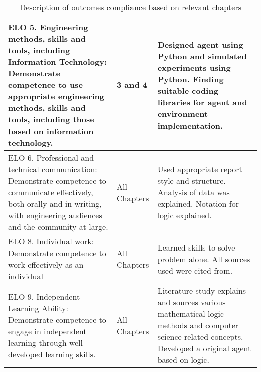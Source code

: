 \begin{table}[H]
\begin{center}
\begin{tabular}{ | p{8cm} | l | p{6cm} |}
    ELO 5. Engineering methods, skills and tools, including Information Technology: Demonstrate competence to use appropriate engineering methods, skills and tools, including those based on information technology. & 3 and 4 & Designed agent using Python and simulated experiments using Python. Finding suitable coding libraries for agent and environment implementation. \\  \hline



	ELO 6. Professional and technical communication: Demonstrate competence to communicate effectively, both orally and in writing, with engineering audiences and the community at large. & All Chapters &  Used appropriate report style and structure. Analysis of data was explained. Notation for logic explained.  \\  \hline




    ELO 8. Individual work: Demonstrate competence to work effectively as an individual & All Chapters & Learned skills to solve problem alone. All sources used were cited from. \\  \hline



    ELO 9. Independent Learning Ability: Demonstrate competence to engage in independent learning through well‐developed learning skills. & All Chapters &  Literature study explains and sources various mathematical logic methods and computer science related concepts. Developed a original agent based on logic.\\  \hline

    \hline
    \end{tabular}
\end{center}
  \caption{ Description of outcomes compliance based on relevant chapters}
    \label{tab:tableb1}
\end{table}